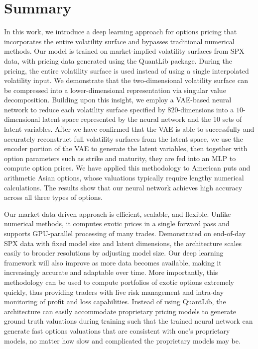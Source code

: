 \documentclass[%
 reprint,
 superscriptaddress,
nobibnotes,
 amsmath,amssymb,
 aip,
]{revtex4-2}
\begin{document}
\section{Summary}
In this work, we introduce a deep learning approach for options pricing that incorporates the entire volatility surface and bypasses traditional numerical methods. Our model is trained on market-implied volatility surfaces from SPX data, with pricing data generated using the QuantLib package. During the pricing, the entire volatility surface is used instead of using a single interpolated volatility input. We demonstrate that the two-dimensional volatility surface can be compressed into a lower-dimensional representation via singular value decomposition. Building upon this insight, we employ a VAE-based neural network to reduce each volatility surface specified by $820$-dimensions into a $10$-dimensional latent space represented by the neural network and the 10 sets of latent variables. After we have confirmed that the VAE is able to successfully and accurately reconstruct full volatility surfaces from the latent space, we use the encoder portion of the VAE to generate the latent variables, then together with option parameters such as strike and maturity, they are fed into an MLP to compute option prices. We have applied this methodology to American puts and arithmetic Asian options, whose valuations typically require lengthy numerical calculations. The results show that our neural network achieves high accuracy across all three types of options.

Our market data driven approach is efficient, scalable, and flexible. Unlike numerical methods, it computes exotic prices in a single forward pass and supports GPU-parallel processing of many trades. Demonstrated on end-of-day SPX data with fixed model size and latent dimensions, the architecture scales easily to broader resolutions by adjusting model size. Our deep learning framework will also improve as more data becomes available, making it increasingly accurate and adaptable over time. More importantly, this methodology can be used to compute portfolios of exotic options extremely quickly, thus providing traders with live risk management and intra-day monitoring of profit and loss capabilities. Instead of using QuantLib, the architecture can easily accommodate proprietary pricing models to generate ground truth valuations during training such that the trained neural network can generate fast options valuations that are consistent with one's proprietary models, no matter how slow and complicated the proprietary models may be. 
\end{document}
